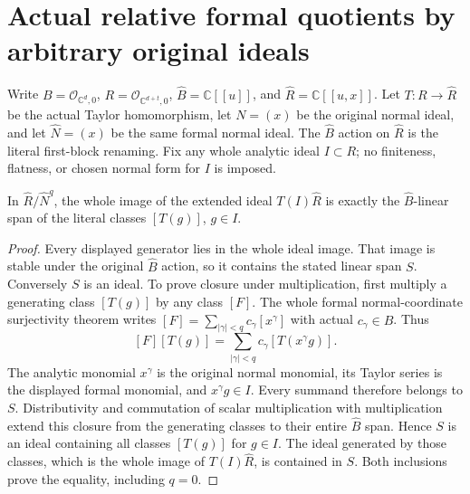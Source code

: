\section{Actual relative formal quotients by arbitrary original ideals}
\label{sec:hironaka-actual-relative-formal-quotients}

Write $B=\mathcal O_{\mathbb C^d,0}$, $R=\mathcal O_{\mathbb C^{d+t},0}$,
$\widehat B=\mathbb C[[u]]$, and $\widehat R=\mathbb C[[u,x]]$.
Let $T:R\to\widehat R$ be the actual Taylor homomorphism, let
$N=(x)$ be the original normal ideal, and let $\widehat N=(x)$ be
the same formal normal ideal. The $\widehat B$ action on
$\widehat R$ is the literal first-block renaming. Fix any whole
analytic ideal $I\subset R$; no finiteness, flatness, or chosen
normal form for $I$ is imposed.

\begin{theorem}
\label{hir:actual-relative-formal-whole-ideal-image}
\leanok
In $\widehat R/\widehat N^q$, the whole image of the extended ideal
$T(I)\widehat R$ is exactly the $\widehat B$-linear span of
the literal classes $[T(g)]$, $g\in I$.
\end{theorem}
\begin{proof}
Every displayed generator lies in the whole ideal image. That image
is stable under the original $\widehat B$ action, so it contains
the stated linear span $S$. Conversely $S$ is an ideal. To prove
closure under multiplication, first multiply a generating class
$[T(g)]$ by any class $[F]$. The whole formal normal-coordinate
surjectivity theorem writes
$[F]=\sum_{|\gamma|<q}c_\gamma[x^\gamma]$ with actual
$c_\gamma\in\widehat B$. Thus
\[
 [F][T(g)]=\sum_{|\gamma|<q}c_\gamma[T(x^\gamma g)].
\]
The analytic monomial $x^\gamma$ is the original normal monomial,
its Taylor series is the displayed formal monomial, and
$x^\gamma g\in I$. Every summand therefore belongs to $S$.
Distributivity and commutation of scalar multiplication with
multiplication extend this closure from the generating classes to
their entire $\widehat B$ span. Hence $S$ is an ideal containing
all classes $[T(g)]$ for $g\in I$. The ideal generated by those
classes, which is the whole image of $T(I)\widehat R$, is contained
in $S$. Both inclusions prove the equality, including $q=0$.
\end{proof}

